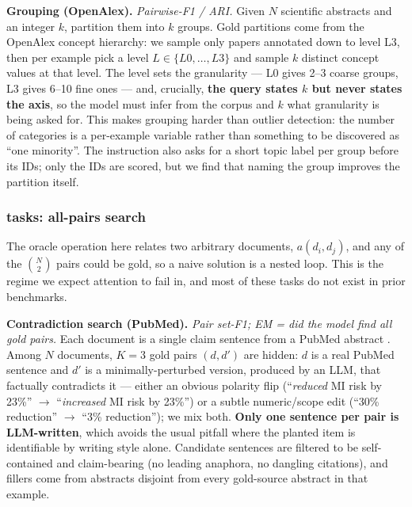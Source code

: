 \textbf{Grouping (OpenAlex).} \emph{Pairwise-F1 / ARI.} Given $N$ scientific abstracts and an integer $k$, partition them into $k$ groups. Gold partitions come from the OpenAlex \citep{Priem2022OpenAlexAF} concept hierarchy: we sample only papers annotated down to level L3, then per example pick a level $L \in \{L0,\ldots,L3\}$ and sample $k$ distinct concept values at that level. The level sets the granularity --- L0 gives 2--3 coarse groups, L3 gives 6--10 fine ones --- and, crucially, \textbf{the query states $k$ but never states the axis}, so the model must infer from the corpus and $k$ what granularity is being asked for. This makes grouping harder than outlier detection: the number of categories is a per-example variable rather than something to be discovered as ``one minority''. The instruction also asks for a short topic label per group before its IDs; only the IDs are scored, but we find that naming the group improves the partition itself.

\subsubsection{ tasks: all-pairs search}

The oracle operation here relates two arbitrary documents, $a(d_i, d_j)$, and any of the $\binom{N}{2}$ pairs could be gold, so a naive solution is a nested loop. This is the regime we expect  attention to fail in, and most of these tasks do not exist in prior benchmarks.

\textbf{Contradiction search (PubMed).} \emph{Pair set-F1; EM = did the model find all gold pairs.} Each document is a single claim sentence from a PubMed abstract \citep{Jin2019PubMedQAAD}. Among $N$ documents, $K{=}3$ gold pairs $(d, d')$ are hidden: $d$ is a real PubMed sentence and $d'$ is a minimally-perturbed version, produced by an LLM, that factually contradicts it --- either an obvious polarity flip (``\emph{reduced} MI risk by 23\%'' $\to$ ``\emph{increased} MI risk by 23\%'') or a subtle numeric/scope edit (``30\% reduction'' $\to$ ``3\% reduction''); we mix both. \textbf{Only one sentence per pair is LLM-written}, which avoids the usual pitfall where the planted item is identifiable by writing style alone. Candidate sentences are filtered to be self-contained and claim-bearing (no leading anaphora, no dangling citations), and fillers come from abstracts disjoint from every gold-source abstract in that example.

